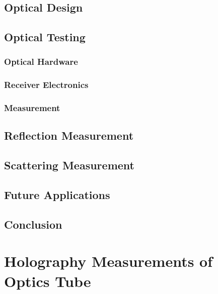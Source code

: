 \subsection{Optical Design}
\subsection{Optical Testing}
\subsubsection{Optical Hardware}
\subsubsection{Receiver Electronics}
\subsubsection{Measurement}
\subsection{Reflection Measurement}
\subsection{Scattering Measurement}
\subsection{Future Applications}
\subsection{Conclusion}
\section{Holography Measurements of Optics Tube}